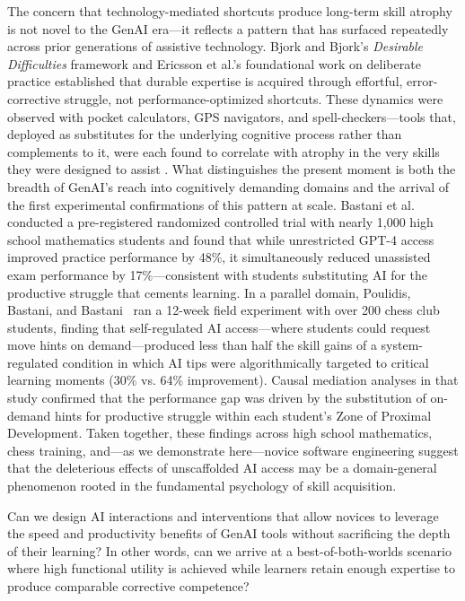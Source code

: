 \documentclass[sigconf]{acmart}
\begin{document}
The concern that technology-mediated shortcuts produce long-term skill atrophy is not novel to the GenAI era---it reflects a pattern that has surfaced repeatedly across prior generations of assistive technology. Bjork and Bjork's \textit{Desirable Difficulties} framework \cite{bjork2011desirable} and Ericsson et al.'s foundational work on deliberate practice \cite{ericsson1993} established that durable expertise is acquired through effortful, error-corrective struggle, not performance-optimized shortcuts. These dynamics were observed with pocket calculators, GPS navigators, and spell-checkers---tools that, deployed as substitutes for the underlying cognitive process rather than complements to it, were each found to correlate with atrophy in the very skills they were designed to assist \cite{kirschner2006minimal}. What distinguishes the present moment is both the breadth of GenAI's reach into cognitively demanding domains and the arrival of the first experimental confirmations of this pattern at scale. Bastani et al.~\cite{bastani2025} conducted a pre-registered randomized controlled trial with nearly 1,000 high school mathematics students and found that while unrestricted GPT-4 access improved practice performance by 48\%, it simultaneously reduced unassisted exam performance by 17\%---consistent with students substituting AI for the productive struggle that cements learning. In a parallel domain, Poulidis, Bastani, and Bastani~\cite{poulidis2025} ran a 12-week field experiment with over 200 chess club students, finding that self-regulated AI access---where students could request move hints on demand---produced less than half the skill gains of a system-regulated condition in which AI tips were algorithmically targeted to critical learning moments (30\% vs. 64\% improvement). Causal mediation analyses in that study confirmed that the performance gap was driven by the substitution of on-demand hints for productive struggle within each student's Zone of Proximal Development. Taken together, these findings across high school mathematics, chess training, and---as we demonstrate here---novice software engineering suggest that the deleterious effects of unscaffolded AI access may be a domain-general phenomenon rooted in the fundamental psychology of skill acquisition.

Can we design AI interactions and interventions that allow novices to leverage the speed and productivity benefits of GenAI tools without sacrificing the depth of their learning? In other words, can we arrive at a best-of-both-worlds scenario where high functional utility is achieved while learners retain enough expertise to produce comparable corrective competence?
\end{document}

